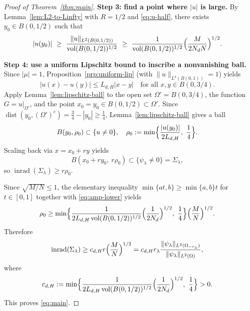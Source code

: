 \documentclass[10pt,a4paper]{amsart}
\newcommand{\dist}{\operatorname{dist}}
\newcommand{\inrad}{\operatorname{inrad}}
\newcommand{\vol}{\operatorname{vol}}
\begin{document}
\begin{proof}[Proof of Theorem~\ref{thm:main}]
\textbf{Step 3: find a point where $|u|$ is large.}
By Lemma~\ref{lem:L2-to-Linfty} with $R = 1/2$ and \eqref{eq:u-half}, there exists $y_0\in B(0,1/2)$ such that
\begin{equation}\label{eq:amp-lower}
|u(y_0)|\ \ge\ \frac{\|u\|_{L^2(B(0,1/2))}}{\vol(B(0,1/2))^{1/2}}
\ \ge\ \frac{1}{\vol(B(0,1/2))^{1/2}}\Bigl(\frac{M}{2N_d N}\Bigr)^{1/2}.
\end{equation}

\textbf{Step 4: use a uniform Lipschitz bound to inscribe a nonvanishing ball.}
Since $|\mu| = 1$, Proposition~\ref{prp:uniform-lip} (with $\|u\|_{L^2(B(0,1))} = 1$) yields
$$
|u(x)-u(y)|\le L_{d,H}|x-y|\quad\text{for all }x,y\in B(0,3/4).
$$
Apply Lemma~\ref{lem:lipschitz-ball} to the open set $\Omega' = B(0,3/4)$, the function $G = u|_{\Omega'}$, and the point $x_0 = y_0\in B(0,1/2)\subset\Omega'$.
Since $\dist(y_0,(\Omega')^c) = \frac34-|y_0|\ge \frac14$, Lemma~\ref{lem:lipschitz-ball} gives a ball
$$
B(y_0,\rho_0)\subset\{u\neq 0\},
\quad
\rho_0 := \min\Bigl\{\frac{|u(y_0)|}{2L_{d,H}},\ \frac14\Bigr\}.
$$
Scaling back via $x = x_0+r y$ yields
$$
B(x_0+r y_0,\ r\rho_0)\subset\{\psi_\lambda\neq 0\} = \Sigma_\lambda,
$$
so $\inrad(\Sigma_\lambda)\ge r\rho_0$.

Since $\sqrt{M/N}\le 1$, the elementary inequality $\min\{a t,b\}\ge \min\{a,b\} t$ for $t\in[0,1]$
together with \eqref{eq:amp-lower} yields
$$
\rho_0
\ge
\min\Bigl\{
\frac{1}{2L_{d,H} \vol(B(0,1/2))^{1/2}}\Bigl(\frac{1}{2N_d}\Bigr)^{1/2},
\ \frac14
\Bigr\} \Bigl(\frac{M}{N}\Bigr)^{1/2}.
$$
Therefore
$$
\inrad(\Sigma_\lambda)
\ge
c_{d,H} r \Bigl(\frac{M}{N}\Bigr)^{1/2}
 = 
c_{d,H} r_\lambda 
\frac{\|\psi_\lambda\|_{L^2(\Omega_{-r_\lambda})}}{\|\psi_\lambda\|_{L^2(\Omega)}},
$$
where
$$
c_{d,H} := 
\min\Bigl\{
\frac{1}{2L_{d,H} \vol(B(0,1/2))^{1/2}}\Bigl(\frac{1}{2N_d}\Bigr)^{1/2},
\ \frac14
\Bigr\}>0.
$$
This proves \eqref{eq:main}.
\end{proof}
\end{document}
